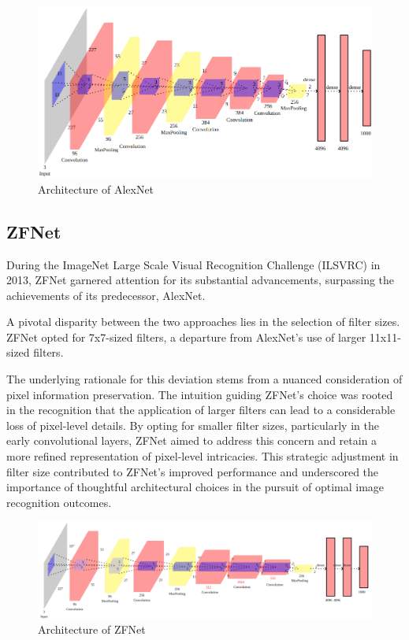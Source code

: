 \documentclass{report}
\begin{document}
\begin{figure}[ht]
	\includegraphics[width=350pt]{49}
	\centering
	\caption{Architecture of AlexNet}
\end{figure}

\subsection{ZFNet}
During the ImageNet Large Scale Visual Recognition Challenge (ILSVRC) in 2013, ZFNet garnered attention for its substantial advancements, surpassing the achievements of its predecessor, AlexNet.

A pivotal disparity between the two approaches lies in the selection of filter sizes. ZFNet opted for 7x7-sized filters, a departure from AlexNet's use of larger 11x11-sized filters.

The underlying rationale for this deviation stems from a nuanced consideration of pixel information preservation. The intuition guiding ZFNet's choice was rooted in the recognition that the application of larger filters can lead to a considerable loss of pixel-level details. By opting for smaller filter sizes, particularly in the early convolutional layers, ZFNet aimed to address this concern and retain a more refined representation of pixel-level intricacies. This strategic adjustment in filter size contributed to ZFNet's improved performance and underscored the importance of thoughtful architectural choices in the pursuit of optimal image recognition outcomes.

\begin{figure}[ht]
	\includegraphics[width=350pt]{50}
	\centering
	\caption{Architecture of ZFNet}
\end{figure}
\end{document}
